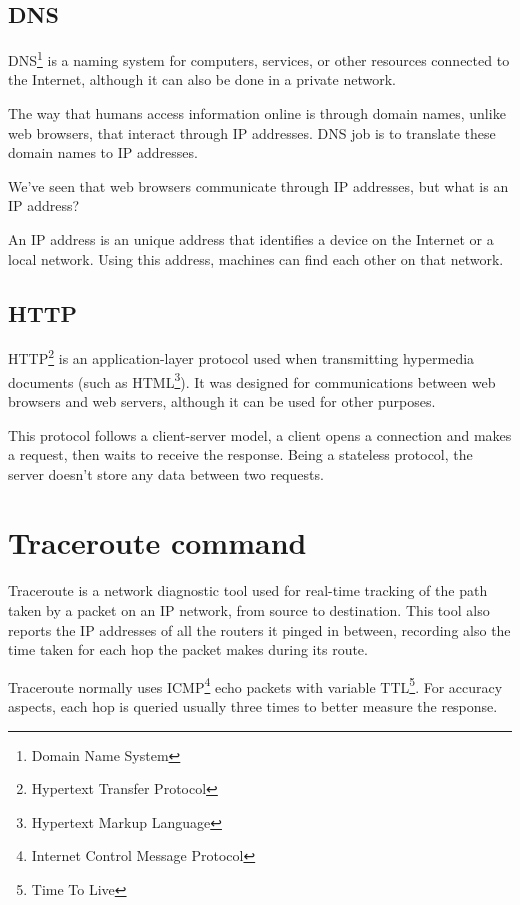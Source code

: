 \documentclass{article}
\newcommand\tab[1][1cm]{\hspace*{#1}}
\begin{document}
\subsection{DNS} 

\tab DNS\footnote{Domain Name System} is a naming system for computers, services, or other resources connected to the Internet, although it can also be done in a private network.

The way that humans access information online is through domain names, unlike web browsers, that interact through IP addresses. DNS job is to translate these domain names to IP addresses.

We've seen that web browsers communicate through IP addresses, but what is an IP address?

An IP address is an unique address that identifies a device on the Internet or a local network. Using this address, machines can find each other on that network.

\subsection{HTTP}

\tab HTTP\footnote{Hypertext Transfer Protocol} is an application-layer protocol used when transmitting hypermedia documents (such as HTML\footnote{Hypertext Markup Language}). It was designed for communications between web browsers and web servers, although it can be used for other purposes. 

This protocol follows a client-server model, a client opens a connection and makes a request, then waits to receive the response. Being a stateless protocol, the server doesn't store any data between two requests.

\section{Traceroute command}

\tab Traceroute is a network diagnostic tool used for real-time tracking of the path taken by a packet on an IP network, from source to destination. This tool also reports the IP addresses of all the routers it pinged in between, recording also the time taken for each hop the packet makes during its route.

Traceroute normally uses ICMP\footnote{Internet Control Message Protocol} echo packets with variable TTL\footnote{Time To Live}. For accuracy aspects, each hop is queried usually three times to better measure the response. 
\end{document}
